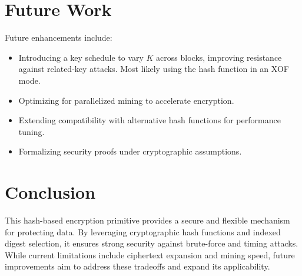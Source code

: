\documentclass[11pt,a4paper]{article}
\begin{document}
\section*{Future Work}

Future enhancements include:
\begin{itemize}
  \item Introducing a key schedule to vary \( K \) across blocks, improving resistance against related-key attacks. Most likely using the hash function in an XOF mode.
  \item Optimizing for parallelized mining to accelerate encryption.
  \item Extending compatibility with alternative hash functions for performance tuning.
  \item Formalizing security proofs under cryptographic assumptions.
\end{itemize}

\section*{Conclusion}

This hash-based encryption primitive provides a secure and flexible mechanism for protecting data. By leveraging cryptographic hash functions and indexed digest selection, it ensures strong security against brute-force and timing attacks. While current limitations include ciphertext expansion and mining speed, future improvements aim to address these tradeoffs and expand its applicability.
\end{document}
